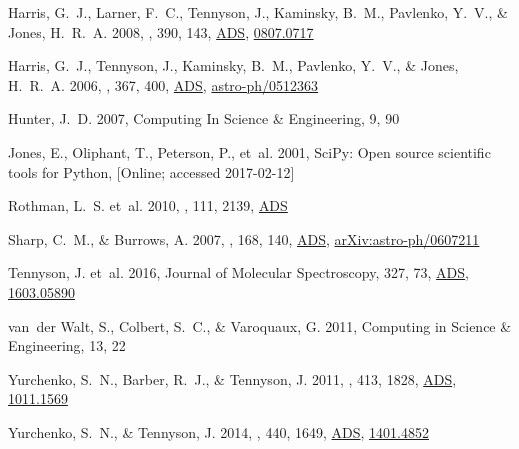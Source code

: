 \documentclass[tighten, times, twocolumn, trackchanges]{aastex61}
\newcommand{\eprint}[1]{\href{http://arxiv.org/abs/#1}{#1}}
\renewcommand{\eprint}[1]{\href{http://arxiv.org/abs/#1}{#1}}
\providecommand{\adsurl}[1]{\href{#1}{ADS}}
\begin{document}
\begin{thebibliography}{18}
{Harris}, G.~J., {Larner}, F.~C., {Tennyson}, J., {Kaminsky}, B.~M.,
  {Pavlenko}, Y.~V., \& {Jones}, H.~R.~A. 2008, \mnras, 390, 143,
  \adsurl{http://adsabs.harvard.edu/abs/2008MNRAS.390..143H},
  \eprint{0807.0717}

{Harris}, G.~J., {Tennyson}, J., {Kaminsky}, B.~M., {Pavlenko}, Y.~V., \&
  {Jones}, H.~R.~A. 2006, \mnras, 367, 400,
  \adsurl{http://adsabs.harvard.edu/abs/2006MNRAS.367..400H},
  \eprint{astro-ph/0512363}

Hunter, J.~D. 2007, Computing In Science \& Engineering, 9, 90

Jones, E., Oliphant, T., Peterson, P., {et~al.} 2001, {SciPy}: Open source
  scientific tools for {Python}, [Online; accessed 2017-02-12]

{Rothman}, L.~S. {et~al.} 2010, \jqsrt, 111, 2139,
  \adsurl{http://adsabs.harvard.edu/abs/2010JQSRT.111.2139R}

{Sharp}, C.~M., \& {Burrows}, A. 2007, \apjs, 168, 140,
  \adsurl{http://adsabs.harvard.edu/abs/2007ApJS..168..140S},
  \eprint{arXiv:astro-ph/0607211}

{Tennyson}, J. {et~al.} 2016, Journal of Molecular Spectroscopy, 327, 73,
  \adsurl{http://adsabs.harvard.edu/abs/2016JMoSp.327...73T},
  \eprint{1603.05890}

van~der Walt, S., Colbert, S.~C., \& Varoquaux, G. 2011, Computing in Science
  \& Engineering, 13, 22

{Yurchenko}, S.~N., {Barber}, R.~J., \& {Tennyson}, J. 2011, \mnras, 413, 1828,
  \adsurl{http://adsabs.harvard.edu/abs/2011MNRAS.413.1828Y},
  \eprint{1011.1569}

{Yurchenko}, S.~N., \& {Tennyson}, J. 2014, \mnras, 440, 1649,
  \adsurl{http://adsabs.harvard.edu/abs/2014MNRAS.440.1649Y},
  \eprint{1401.4852}
\end{thebibliography}
\end{document}
